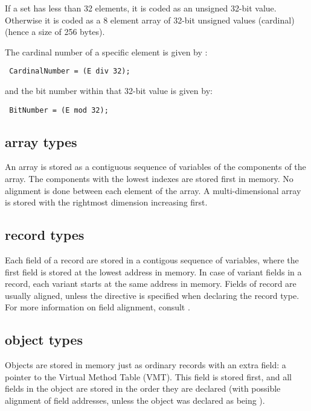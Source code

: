 If a set has less than 32 elements, it is coded as an unsigned
32-bit value. Otherwise it is coded as a 8 element array of
32-bit unsigned values (cardinal) (hence a size of 256 bytes).

The cardinal number of a specific element  is given by :

\begin{verbatim}
 CardinalNumber = (E div 32);
\end{verbatim}

and the bit number within that 32-bit value is given by:
\begin{verbatim}
 BitNumber = (E mod 32);
\end{verbatim}

\subsection{array types}

An array is stored as a contiguous sequence of variables
of the components of the array. The components with the
lowest indexes are stored first in memory. No alignment
is done between each element of the array. A multi-dimensional
array is stored with the rightmost dimension increasing first.

\subsection{record types}

Each field of a record are stored in a contigous sequence
of variables, where the first field is stored at the
lowest address in memory. In case of variant fields in
a record, each variant starts at the same address in
memory. Fields of record are usually aligned, unless
the  directive is specified when declaring
the record type. For more information on field alignment,
consult .

\subsection{object types}
\label{subse:ObjMemory}

Objects are stored in memory just as ordinary records with an extra field:
a pointer to the Virtual Method Table (VMT). This field is stored first, and
all fields in the object are stored in the order they are declared (with possible
alignment of field addresses, unless the object was declared as being ).

